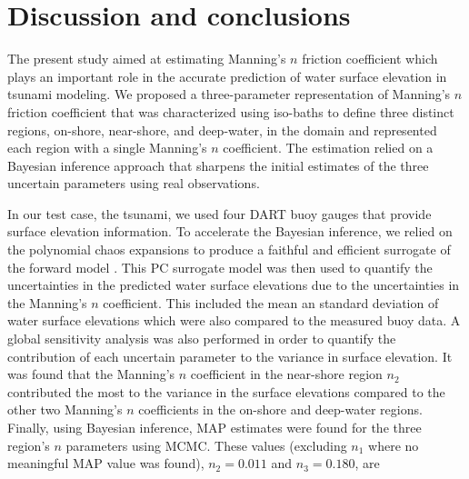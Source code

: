 \section{Discussion and conclusions}
\label{sec:conc}

The present study aimed at estimating Manning's $n$ friction coefficient  which
plays an important role in the accurate prediction of water surface elevation in
tsunami modeling. We proposed a three-parameter representation of Manning's $n$
friction coefficient that was characterized using iso-baths  to define three
distinct regions, on-shore, near-shore, and deep-water, in the domain and
represented each region with a single Manning's $n$ coefficient.  The estimation
relied on a Bayesian inference approach that sharpens the initial estimates of
the three uncertain parameters using real observations.

In our test case, the \tohoku tsunami, we used four DART buoy gauges that
provide  surface elevation information.  To accelerate the Bayesian inference,
we relied on the polynomial  chaos expansions to produce a faithful and
efficient surrogate of the forward model \geoclaw.  This PC surrogate model was
then used to quantify the uncertainties in the predicted water surface
elevations due to the uncertainties in the Manning's $n$ coefficient.  This
included the mean an standard deviation of water surface elevations which were
also compared to the measured buoy data.  A global sensitivity analysis was also
performed in order to quantify the contribution of each uncertain parameter to
the variance in surface elevation.  It was found that the Manning's $n$
coefficient in the near-shore region $n_2$ contributed the most to the variance
in the surface elevations compared to the other two Manning's $n$ coefficients
in the on-shore and deep-water regions.  Finally, using Bayesian inference, MAP
estimates were found for the three region's $n$ parameters using MCMC.  These
values (excluding $n_1$ where no meaningful MAP value was found), $n_2=0.011$
and $n_3=0.180$, are 





